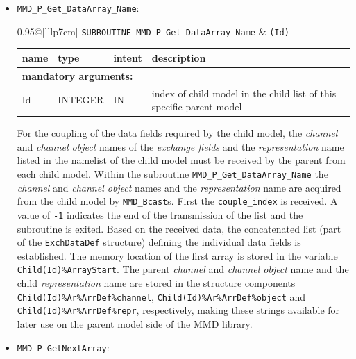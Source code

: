 \documentclass[twoside]{article}
\begin{document}
\begin{itemize}
\item  \verb|MMD_P_Get_DataArray_Name|:\\
\vspace*{-0.3cm}

\begin{tabular*}{0.95\textwidth}{@{\extracolsep\fill}|lllp{7cm}|}
\hline
{}
{\tt  SUBROUTINE MMD\_P\_Get\_DataArray\_Name} &
{\tt (Id)}\\
\hline
\end{tabular*}
\begin{tabular*}{0.95\textwidth}{@{\extracolsep\fill}|lllp{7cm}|}
name & type & intent & description\\
\hline
\multicolumn{4}{|l|}{\bf mandatory arguments:}\\
Id & {\footnotesize INTEGER} & IN &  index of child model in the child list of this specific parent model\\
\hline
\end{tabular*}
\smallskip

For the coupling of the data fields required by the child model, the
 {\it channel} and {\it channel object} 
 names of the {\it exchange fields} and the {\it representation} name
 listed in the namelist of the child model must be received by 
 the parent from each child model. Within the subroutine 
\verb|MMD_P_Get_DataArray_Name| the {\it channel} and {\it channel object}
 names and the {\it representation} name are acquired from the child model by
 \verb|MMD_Bcast|s.
First the \verb|couple_index| is received. A value of \verb|-1| indicates the
end of the transmission of the list and the subroutine is exited.
Based on the received data, the concatenated list (part of the \verb|ExchDataDef|
 structure) defining the individual data fields is established.
The memory location of the first array is stored in the variable 
\verb|Child(Id)%ArrayStart|. The parent {\it channel} and {\it channel object}
 name and the child {\it representation} name are stored in the structure 
components \verb|Child(Id)%Ar%ArrDef%channel|,  
\verb|Child(Id)%Ar%ArrDef%object| 
and \verb|Child(Id)%Ar%ArrDef%repr|, respectively, making these strings
available for later use on the parent model side of the MMD library.

\item  \verb|MMD_P_GetNextArray|:\\
\vspace*{-0.3cm}


\end{itemize}
\end{document}

